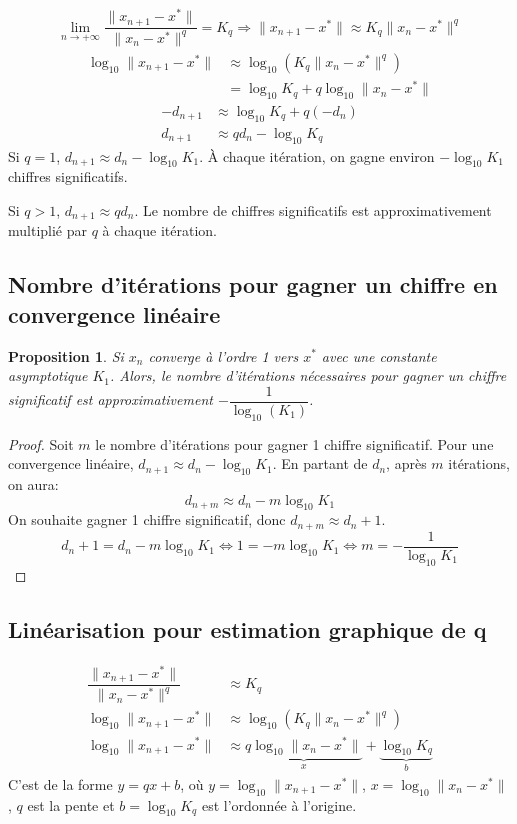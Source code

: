 \documentclass{article}
\newtheorem{proposition}[theorem]{Proposition}
\begin{document}
\begin{align*}
\lim\limits_{n \to +\infty} \dfrac{\|x_{n+1}-x^*\|}{\|x_n-x^*\|^q} = K_q \Rightarrow \|x_{n+1}-x^*\| \approx K_q \|x_n-x^*\|^q
\end{align*}
\begin{align*}
\log_{10} \|x_{n+1}-x^*\| &\approx \log_{10} (K_q \|x_n-x^*\|^q) \\
&= \log_{10} K_q + q \log_{10} \|x_n-x^*\|
\end{align*}
\begin{align*}
-d_{n+1} &\approx \log_{10} K_q + q (-d_n) \\
d_{n+1} &\approx q d_n - \log_{10} K_q
\end{align*}
Si $q=1$, $d_{n+1} \approx d_n - \log_{10} K_1$. À chaque itération, on gagne environ $-\log_{10} K_1$ chiffres significatifs.

Si $q > 1$, $d_{n+1} \approx q d_n$. Le nombre de chiffres significatifs est approximativement multiplié par $q$ à chaque itération.

\subsection{Nombre d'itérations pour gagner un chiffre en convergence linéaire}

\begin{proposition}
Si $x_n$ converge à l'ordre 1 vers $x^*$ avec une constante asymptotique $K_1$. Alors, le nombre d'itérations nécessaires pour gagner un chiffre significatif est approximativement $-\dfrac{1}{\log_{10}(K_1)}$.
\end{proposition}

\begin{proof}
Soit $m$ le nombre d'itérations pour gagner 1 chiffre significatif.
Pour une convergence linéaire, $d_{n+1} \approx d_n - \log_{10} K_1$. En partant de $d_n$, après $m$ itérations, on aura:
$$ d_{n+m} \approx d_n -m \log_{10} K_1 $$
On souhaite gagner 1 chiffre significatif, donc $d_{n+m} \approx d_n + 1$.
$$ d_n + 1 = d_n - m \log_{10} K_1 \Leftrightarrow 1 = - m \log_{10} K_1 \Leftrightarrow m = - \dfrac{1}{\log_{10} K_1} $$
\end{proof}


\subsection{Linéarisation pour estimation graphique de q}
\begin{align*}
\dfrac{\|x_{n+1}-x^*\|}{\|x_n-x^*\|^q} &\approx K_q \\
\log_{10} \|x_{n+1}-x^*\| &\approx \log_{10} (K_q \|x_n-x^*\|^q) \\
\log_{10} \|x_{n+1}-x^*\| &\approx \underbrace{q \log_{10} \|x_n-x^*\|}_{x} + \underbrace{\log_{10} K_q}_{b}
\end{align*}
C'est de la forme $y = qx + b$, où $y = \log_{10} \|x_{n+1}-x^*\|$, $x = \log_{10} \|x_n-x^*\|$, $q$ est la pente et $b = \log_{10} K_q$ est l'ordonnée à l'origine.
\end{document}

